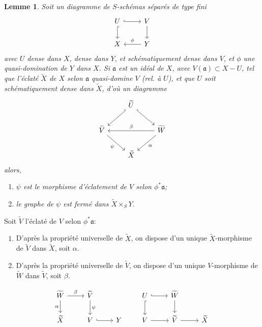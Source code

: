 \documentclass[11pt,a4paper]{article}
\theoremstyle{plain}
\newtheorem{lemma}[theorem]{Lemme}
\theoremstyle{definition}
\begin{document}
\begin{lemma}
Soit un diagramme de $S$-sch\'emas s\'epar\'es de type fini
\[
\begin{tikzcd}
U \arrow[d, hook] \arrow[r, hook] & V \arrow[d] \\
X & Y \arrow[l, "\phi"']
\end{tikzcd}
\]
avec $U$ dense dans $X$, dense dans $Y$, et sch\'ematiquement dense dans $V$, et $\phi$ une quasi-domination de $Y$ dans $X$. Si $\mathfrak{a}$ est un id\'eal de $X$, avec $V(\mathfrak{a}) \subset X - U$, tel que l'\'eclat\'e $\widetilde{X}$ de $X$ selon $\mathfrak{a}$ quasi-domine $V$ (rel. \`a $U$), et que $U$ soit sch\'ematiquement dense dans $\widetilde{X}$, d'o\`u un diagramme
\[
\begin{tikzcd}
& \widetilde{U} \arrow[dl, hook'] \arrow[dr, hook] \\
\widetilde{V} \arrow[dr, "\psi"'] & & \widetilde{W} \arrow[ll, "\beta"'] \arrow[dl, "\alpha"] \\
& \widetilde{X}
\end{tikzcd}
\]
alors,
\begin{enumerate}[label=(\alph*)]
\item $\psi$ est le morphisme d'\'eclatement de $V$ selon $\phi^*\mathfrak{a}$;
\item le graphe de $\psi$ est ferm\'e dans $\widetilde{X} \times_S Y$.
\end{enumerate}
\end{lemma}

Soit $\widetilde{V}$ l'\'eclat\'e de $V$ selon $\phi^*\mathfrak{a}$:
\begin{enumerate}[label=(\arabic*)]
\item D'apr\`es la propri\'et\'e universelle de $\widetilde{X}$, on dispose d'un unique $\widetilde{X}$-morphisme de $\widetilde{V}$ dans $\widetilde{X}$, soit $\alpha$.
\item D'apr\`es la propri\'et\'e universelle de $\widetilde{V}$, on dispose d'un unique $V$-morphisme de $\widetilde{W}$ dans $\widetilde{V}$, soit $\beta$.
\end{enumerate}

\[
\begin{tikzcd}
\widetilde{W} \arrow[r, "\beta"] \arrow[d, "\alpha"'] & \widetilde{V} \arrow[d, "\psi"] \\
\widetilde{X} & V \arrow[r, hook] & Y
\end{tikzcd}
\qquad
\begin{tikzcd}
U \arrow[r, hook] \arrow[d, hook] & \widetilde{W} \arrow[d] \\
V \arrow[r] & \widetilde{V} \arrow[r] & \widetilde{X}
\end{tikzcd}
\]
\end{document}
